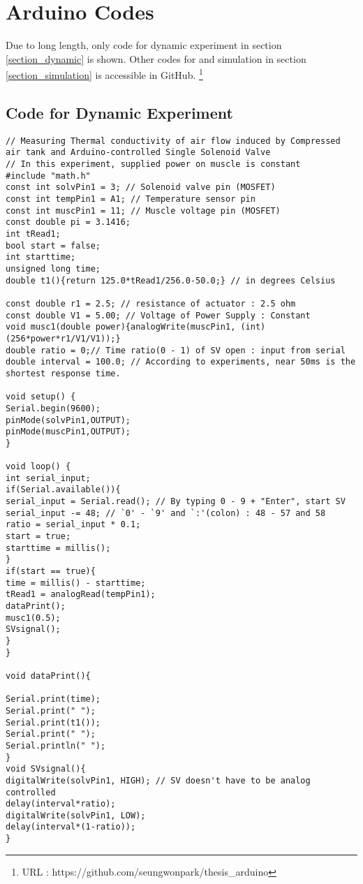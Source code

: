 \section{Arduino Codes}
Due to long length, only code for dynamic experiment in section \ref{section_dynamic} is shown. Other codes for \apc and simulation in section \ref{section_simulation} is accessible in GitHub.
\footnote{URL : https://github.com/seungwonpark/thesis\_arduino}

\subsection{Code for Dynamic Experiment}\label{code_dynamic}
\begin{scriptsize}
\begin{verbatim}
// Measuring Thermal conductivity of air flow induced by Compressed air tank and Arduino-controlled Single Solenoid Valve
// In this experiment, supplied power on muscle is constant
#include "math.h"
const int solvPin1 = 3; // Solenoid valve pin (MOSFET)
const int tempPin1 = A1; // Temperature sensor pin
const int muscPin1 = 11; // Muscle voltage pin (MOSFET)
const double pi = 3.1416;
int tRead1;
bool start = false;
int starttime;
unsigned long time;
double t1(){return 125.0*tRead1/256.0-50.0;} // in degrees Celsius

const double r1 = 2.5; // resistance of actuator : 2.5 ohm
const double V1 = 5.00; // Voltage of Power Supply : Constant
void musc1(double power){analogWrite(muscPin1, (int)(256*power*r1/V1/V1));}
double ratio = 0;// Time ratio(0 - 1) of SV open : input from serial
double interval = 100.0; // According to experiments, near 50ms is the shortest response time.

void setup() {
Serial.begin(9600);
pinMode(solvPin1,OUTPUT);
pinMode(muscPin1,OUTPUT);
}

void loop() {
int serial_input;
if(Serial.available()){ 
serial_input = Serial.read(); // By typing 0 - 9 + "Enter", start SV
serial_input -= 48; // `0' - `9' and `:'(colon) : 48 - 57 and 58
ratio = serial_input * 0.1;
start = true;
starttime = millis();
}
if(start == true){
time = millis() - starttime;
tRead1 = analogRead(tempPin1);
dataPrint();
musc1(0.5);
SVsignal();
}
}

void dataPrint(){

Serial.print(time);
Serial.print(" ");
Serial.print(t1());
Serial.print(" ");
Serial.println(" ");
}
void SVsignal(){
digitalWrite(solvPin1, HIGH); // SV doesn't have to be analog controlled
delay(interval*ratio);
digitalWrite(solvPin1, LOW);
delay(interval*(1-ratio));
}
\end{verbatim}
\end{scriptsize}
